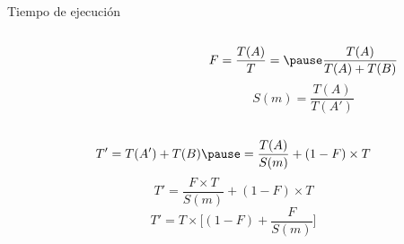 \begin{frame}[t]{Tiempo de ejecución}
\begin{columns}
\begin{column}{0.5\textwidth}
\end{column}
\pause
\begin{column}{.5\textwidth}
\begin{small}
\begin{displaymath}
F=\frac{T(A)}{T} = \pause
\frac{T(A)}{T(A)+T(B)}
\end{displaymath}
\pause
\begin{displaymath}
S(m)=\frac{T(A)}{T(A')}
\end{displaymath}
\end{small}
\end{column}
\end{columns}
\pause
\begin{small}
\begin{displaymath}
T'=T(A')+T(B) \pause =
\frac{T(A)}{S(m)}+(1-F) \times T
\end{displaymath}
\pause
\begin{displaymath}
T'=\frac{F \times T}{S(m)} + (1-F) \times T
\end{displaymath}
\pause
\begin{displaymath}
T'=T \times \Big[ (1 - F) + \frac{F}{S(m)} \Big]
\end{displaymath}
\end{small}
\end{frame}

